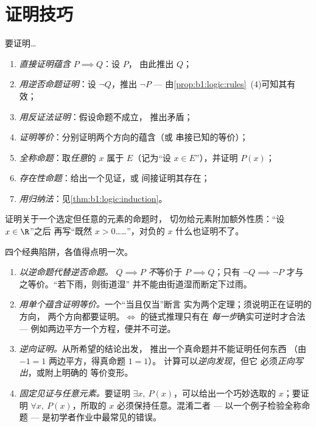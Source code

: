 \section{证明技巧}

\begin{method}[标准的证明模式]\label{met:b1:logic:proofs}
要证明\dots
\begin{enumerate}
  \item \emph{直接证明蕴含 $P \implies Q$}：设 $P$，
        由此推出 $Q$；
  \item \emph{用逆否命题证明}：设 $\lnot Q$，推出 $\lnot P$
        --- 由\cref{prop:b1:logic:rules}~(4)可知其有效；
  \item \emph{用反证法证明}：假设命题不成立，
        推出矛盾；
  \item \emph{证明等价}：分别证明两个方向的蕴含（或
        串接已知的等价）；
  \item \emph{全称命题}：取\emph{任意}的 $x$
        属于 $E$（记为“设 $x \in E$”），并证明 $P(x)$；
  \item \emph{存在性命题}：给出一个见证，或
        间接证明其存在；
  \item \emph{用归纳法}：见\cref{thm:b1:logic:induction}。
\end{enumerate}
证明关于一个选定但任意的元素的命题时，
切勿给元素附加额外性质：“设 $x \in \R$”之后
再写“既然 $x > 0$……”，对负的 $x$ 什么也证明不了。
\end{method}

\begin{remark}[证明中的常见误区]\label{rem:b1:logic:pitfalls}
四个经典陷阱，各值得点明一次。
\begin{enumerate}
  \item \emph{以逆命题代替逆否命题。} $Q \implies P$
        \emph{不}等价于 $P \implies Q$；只有 $\lnot Q
        \implies \lnot P$ 才与之等价。“若下雨，则街道湿”
        并不能由街道湿而断定下过雨。
  \item \emph{用单个蕴含证明等价。}一个“当且仅当”断言
        实为两个定理；须说明正在证明的方向，
        两个方向都要证明。$\iff$ 的链式推理只有在
        \emph{每一步}确实可逆时才合法 ---
        例如两边平方一个方程，便并不可逆。
  \item \emph{逆向证明。}从所希望的结论出发，
        推出一个真命题并不能证明任何东西
        （由 $-1 = 1$ 两边平方，得真命题 $1 = 1$）。
        计算可以\emph{逆向发现}，但它
        必须\emph{正向写出}，或附上明确的
        等价变形。
  \item \emph{固定见证与任意元素。}要证明
        $\exists x,\ P(x)$，可以给出一个巧妙选取的
        $x$；要证明 $\forall x,\ P(x)$，所取的 $x$
        必须保持任意。混淆二者 ---
        以一个例子检验全称命题 ---
        是初学者作业中最常见的错误。
\end{enumerate}
\end{remark}

